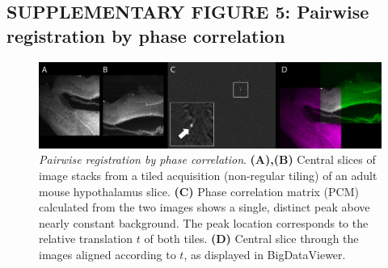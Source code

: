 \documentclass[]{spie}  %
\begin{document}
\subsection*{SUPPLEMENTARY FIGURE 5: Pairwise registration by phase correlation}
\vspace{1mm}
\begin{figure}[h!]
\includegraphics[width=\textwidth]{fig-stitching.png}
\vspace{-2.0mm}
\caption{\hspace{-0.5mm} \emph{Pairwise registration by phase correlation}. \textbf{(A),(B)} Central slices of image stacks from a tiled acquisition (non-regular tiling) of an adult mouse hypothalamus slice. \textbf{(C)} Phase correlation matrix (PCM) calculated from the two images shows a single, distinct peak above nearly constant background. The peak location corresponds to the relative translation $t$ of both tiles. \textbf{(D)} Central slice through the images aligned according to $t$, as displayed in BigDataViewer. 
}
\label{fig:sup-fig-stitching}
\end{figure}

\pagebreak
\end{document}
